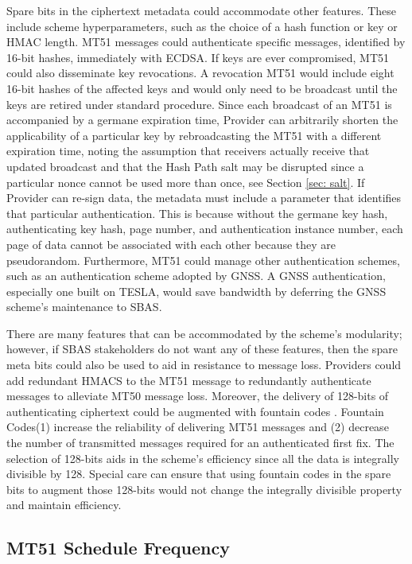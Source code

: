 \documentclass[letterpaper,times]{IONconf/IONconf}
\begin{document}
Spare bits in the ciphertext metadata could accommodate other features.
These include scheme hyperparameters, such as the choice of a hash function or key or HMAC length.
MT51 messages could authenticate specific messages, identified by 16-bit hashes, immediately with ECDSA.
If keys are ever compromised, MT51 could also disseminate key revocations.
A revocation MT51 would include eight 16-bit hashes of the affected keys and would only need to be broadcast until the keys are retired under standard procedure.
Since each broadcast of an MT51 is accompanied by a germane expiration time, Provider can arbitrarily shorten the applicability of a particular key by rebroadcasting the MT51 with a different expiration time, noting the assumption that receivers actually receive that updated broadcast and that the Hash Path salt may be disrupted since a particular nonce cannot be used more than once, see Section \ref{sec: salt}. 
If Provider can re-sign data, the metadata must include a parameter that identifies that particular authentication.
This is because without the germane key hash, authenticating key hash, page number, and authentication instance number, each page of data cannot be associated with each other because they are pseudorandom.
Furthermore, MT51 could manage other authentication schemes, such as an authentication scheme adopted by GNSS.
A GNSS authentication, especially one built on TESLA, would save bandwidth by deferring the GNSS scheme's maintenance to SBAS.

There are many features that can be accommodated by the scheme's modularity; however, if SBAS stakeholders do not want any of these features, then the spare meta bits could also be used to aid in resistance to message loss.
Providers could add redundant HMACS to the MT51 message to redundantly authenticate messages to alleviate MT50 message loss.
Moreover, the delivery of 128-bits of authenticating ciphertext could be augmented with fountain codes \cite{gnss_fountain_codes}.
Fountain Codes(1) increase the reliability of delivering MT51 messages and (2) decrease the number of transmitted messages required for an authenticated first fix.
The selection of 128-bits aids in the scheme's efficiency since all the data is integrally divisible by 128.
Special care can ensure that using fountain codes in the spare bits to augment those 128-bits would not change the integrally divisible property and maintain efficiency.

\subsection{MT51 Schedule Frequency} \label{sec: MT51 Freq}
\end{document}

